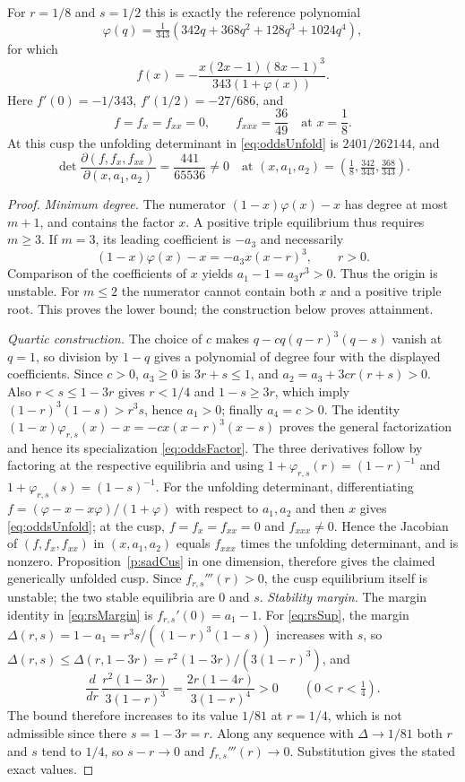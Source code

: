For $r=1/8$ and $s=1/2$ this is exactly the reference polynomial
\[
 \varphi(q)=\tfrac1{343}(342q+368q^2+128q^3+1024q^4),
\]
for which
\begin{equation}\label{eq:oddsFactor}
 f(x)=-\frac{x(2x-1)(8x-1)^3}{343(1+\varphi(x))}.
\end{equation}
Here $f'(0)=-1/343$, $f'(1/2)=-27/686$, and
\[
 f=f_x=f_{xx}=0,\qquad f_{xxx}=\frac{36}{49}
 \quad\text{at }x=\frac18.
\]
At this cusp the unfolding determinant in \eqref{eq:oddsUnfold}
is $2401/262144$, and
\[
 \det\frac{\partial(f,f_x,f_{xx})}{\partial(x,a_1,a_2)}
 =\frac{441}{65536}\ne0
 \quad\text{at }(x,a_1,a_2)
 =\left(\tfrac18,\tfrac{342}{343},\tfrac{368}{343}\right).
\]
\eeP
\begin{proof}
\emph{Minimum degree.}
The numerator $(1-x)\varphi(x)-x$ has degree at most $m+1$,
and contains the factor $x$. A positive triple equilibrium thus
requires $m\ge3$. If $m=3$, its leading coefficient is $-a_3$
and necessarily
\[
 (1-x)\varphi(x)-x=-a_3x(x-r)^3,\qquad r>0.
\]
Comparison of the coefficients of $x$ yields
$a_1-1=a_3r^3>0$. Thus the origin is unstable.
For $m\le2$ the numerator cannot contain both $x$ and a
positive triple root. This proves the lower bound; the construction
below proves attainment.

\emph{Quartic construction.}
The choice of $c$ makes
$q-cq(q-r)^3(q-s)$ vanish at $q=1$, so division by $1-q$
gives a polynomial of degree four with the displayed coefficients.
Since $c>0$, $a_3\ge0$ is $3r+s\le1$, and
$a_2=a_3+3cr(r+s)>0$. Also $r<s\le1-3r$ gives $r<1/4$ and
$1-s\ge3r$, which imply $(1-r)^3(1-s)>r^3s$, hence $a_1>0$;
finally $a_4=c>0$.
The identity
$(1-x)\varphi_{r,s}(x)-x=-cx(x-r)^3(x-s)$ proves the
general factorization and hence its specialization
\eqref{eq:oddsFactor}. The three derivatives follow by factoring at
the respective equilibria and using
$1+\varphi_{r,s}(r)=(1-r)^{-1}$ and
$1+\varphi_{r,s}(s)=(1-s)^{-1}$.
For the unfolding determinant, differentiating
$f=(\varphi-x-x\varphi)/(1+\varphi)$ with respect to $a_1,a_2$
and then $x$ gives \eqref{eq:oddsUnfold}; at the cusp,
$f=f_x=f_{xx}=0$ and $f_{xxx}\ne0$. Hence the Jacobian
of $(f,f_x,f_{xx})$ in $(x,a_1,a_2)$ equals
$f_{xxx}$ times the unfolding determinant, and is nonzero. Proposition~\ref{p:sadCus} in one dimension,
therefore gives the claimed generically unfolded cusp.
Since $f_{r,s}'''(r)>0$, the cusp equilibrium itself is unstable;
the two stable equilibria are $0$ and $s$.
\emph{Stability margin.}
The margin identity in \eqref{eq:rsMargin} is $f_{r,s}'(0)=a_1-1$.
For \eqref{eq:rsSup}, the margin
$\Delta(r,s)=1-a_1=r^3s/((1-r)^3(1-s))$ increases with $s$, so
$\Delta(r,s)\le\Delta(r,1-3r)=r^2(1-3r)/(3(1-r)^3)$, and
\[
 \frac{d}{dr}\,\frac{r^2(1-3r)}{3(1-r)^3}=\frac{2r(1-4r)}{3(1-r)^4}>0
 \qquad(0<r<\tfrac14).
\]
The bound therefore increases to its value $1/81$ at $r=1/4$, which is not
admissible since there $s=1-3r=r$. Along any sequence with
$\Delta\to1/81$ both $r$ and $s$ tend to $1/4$, so $s-r\to0$ and
$f_{r,s}'''(r)\to0$.
Substitution gives the stated exact values.
\end{proof}

